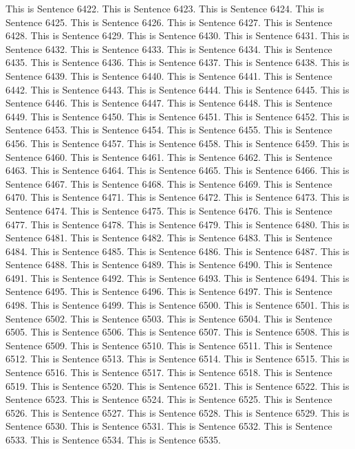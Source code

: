 \documentclass{article}
\begin{document}
This is Sentence 6422.
This is Sentence 6423.
This is Sentence 6424.
This is Sentence 6425.
This is Sentence 6426.
This is Sentence 6427.
This is Sentence 6428.
This is Sentence 6429.
This is Sentence 6430.
This is Sentence 6431.
This is Sentence 6432.
This is Sentence 6433.
This is Sentence 6434.
This is Sentence 6435.
This is Sentence 6436.
This is Sentence 6437.
This is Sentence 6438.
This is Sentence 6439.
This is Sentence 6440.
This is Sentence 6441.
This is Sentence 6442.
This is Sentence 6443.
This is Sentence 6444.
This is Sentence 6445.
This is Sentence 6446.
This is Sentence 6447.
This is Sentence 6448.
This is Sentence 6449.
This is Sentence 6450.
This is Sentence 6451.
This is Sentence 6452.
This is Sentence 6453.
This is Sentence 6454.
This is Sentence 6455.
This is Sentence 6456.
This is Sentence 6457.
This is Sentence 6458.
This is Sentence 6459.
This is Sentence 6460.
This is Sentence 6461.
This is Sentence 6462.
This is Sentence 6463.
This is Sentence 6464.
This is Sentence 6465.
This is Sentence 6466.
This is Sentence 6467.
This is Sentence 6468.
This is Sentence 6469.
This is Sentence 6470.
This is Sentence 6471.
This is Sentence 6472.
This is Sentence 6473.
This is Sentence 6474.
This is Sentence 6475.
This is Sentence 6476.
This is Sentence 6477.
This is Sentence 6478.
This is Sentence 6479.
This is Sentence 6480.
This is Sentence 6481.
This is Sentence 6482.
This is Sentence 6483.
This is Sentence 6484.
This is Sentence 6485.
This is Sentence 6486.
This is Sentence 6487.
This is Sentence 6488.
This is Sentence 6489.
This is Sentence 6490.
This is Sentence 6491.
This is Sentence 6492.
This is Sentence 6493.
This is Sentence 6494.
This is Sentence 6495.
This is Sentence 6496.
This is Sentence 6497.
This is Sentence 6498.
This is Sentence 6499.
This is Sentence 6500.
This is Sentence 6501.
This is Sentence 6502.
This is Sentence 6503.
This is Sentence 6504.
This is Sentence 6505.
This is Sentence 6506.
This is Sentence 6507.
This is Sentence 6508.
This is Sentence 6509.
This is Sentence 6510.
This is Sentence 6511.
This is Sentence 6512.
This is Sentence 6513.
This is Sentence 6514.
This is Sentence 6515.
This is Sentence 6516.
This is Sentence 6517.
This is Sentence 6518.
This is Sentence 6519.
This is Sentence 6520.
This is Sentence 6521.
This is Sentence 6522.
This is Sentence 6523.
This is Sentence 6524.
This is Sentence 6525.
This is Sentence 6526.
This is Sentence 6527.
This is Sentence 6528.
This is Sentence 6529.
This is Sentence 6530.
This is Sentence 6531.
This is Sentence 6532.
This is Sentence 6533.
This is Sentence 6534.
This is Sentence 6535.
\end{document}
